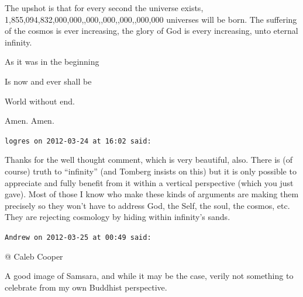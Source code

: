 \begin{footnotesize}
\begin{sffamily}
The upshot is that for every second the universe exists, 1,855,094,832,000,000,,000,,000,,000,,000,000 universes will be born. The suffering of the cosmos is ever increasing, the glory of God is every increasing, unto eternal infinity.

As it was in the beginning

Is now and ever shall be

World without end.

Amen. Amen.

\hfill

\texttt{logres on 2012-03-24 at 16:02 said:}

Thanks for the well thought comment, which is very beautiful, also. There is (of course) truth to ``infinity'' (and Tomberg insists on this) but it is only possible to appreciate and fully benefit from it within a vertical perspective (which you just gave). Most of those I know who make these kinds of arguments are making them precisely so they won't have to address God, the Self, the soul, the cosmos, etc. They are rejecting cosmology by hiding within infinity's sands.

\hfill

\texttt{Andrew on 2012-03-25 at 00:49 said:}

@ Caleb Cooper

A good image of Samsara, and while it may be the case, verily not something to celebrate from my own Buddhist perspective.

\end{sffamily}
\end{footnotesize}

